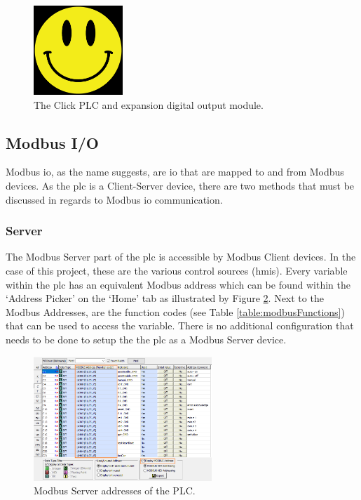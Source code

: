         \begin{figure}[H]
            \centering
            \includegraphics[width = 0.3\textwidth]{2_images/smile.png}
            \caption{The Click PLC and expansion digital output module.}
            \label{fig:plcIO}
        \end{figure}
    
    \subsection{Modbus I/O}
        Modbus \acrshort{io}, as the name suggests, are \acrshort{io} that are mapped to and from Modbus devices. As the \acrshort{plc} is a Client-Server device, there are two methods that must be discussed in regards to Modbus \acrshort{io} communication.

        \subsubsection{Server}
            The Modbus Server part of the \acrshort{plc} is accessible by Modbus Client devices. In the case of this project, these are the various control sources (\acrshort{hmi}s). Every variable within the \acrshort{plc} has an equivalent Modbus address which can be found within the `Address Picker' on the `Home' tab as illustrated by Figure \ref{fig:modbusAdd}. Next to the Modbus Addresses, are the function codes (see Table \ref{table:modbusFunctions}) that can be used to access the variable. There is no additional configuration that needs to be done to setup the the \acrshort{plc} as a Modbus Server device. 
            
        \begin{figure}[H]
            \centering
            \includegraphics[width = 0.6\textwidth]{2_images/modbusAdd}
            \caption{Modbus Server addresses of the PLC.}
            \label{fig:modbusAdd}
        \end{figure}
        
